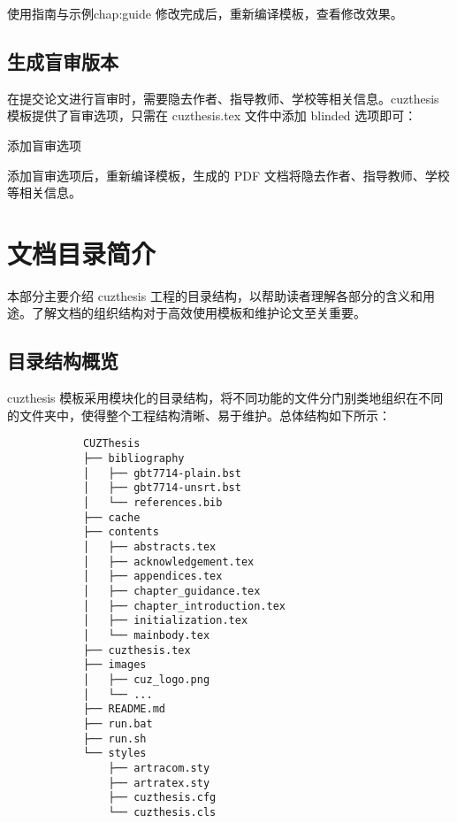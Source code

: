 \begin{cuzchapter}{使用指南与示例}{chap:guide}
    修改完成后，重新编译模板，查看修改效果。

    \subsection{生成盲审版本}

    在提交论文进行盲审时，需要隐去作者、指导教师、学校等相关信息。cuzthesis 模板提供了盲审选项，只需在 cuzthesis.tex 文件中添加 blinded 选项即可：

    \begin{listing}[htbp]
        \caption{添加盲审选项}
        \label{code:blinded-option}
    \end{listing}

    添加盲审选项后，重新编译模板，生成的 PDF 文档将隐去作者、指导教师、学校等相关信息。

    \section{文档目录简介}\label{sec:directory}

    本部分主要介绍 cuzthesis 工程的目录结构，以帮助读者理解各部分的含义和用途。了解文档的组织结构对于高效使用模板和维护论文至关重要。

    \subsection{目录结构概览}\label{sub:directory-overview}

    cuzthesis 模板采用模块化的目录结构，将不同功能的文件分门别类地组织在不同的文件夹中，使得整个工程结构清晰、易于维护。总体结构如下所示：

    \begingroup
    \small\linespread{1}
    \begin{center}
        \begin{verbatim}
            CUZThesis
            ├── bibliography
            │   ├── gbt7714-plain.bst
            │   ├── gbt7714-unsrt.bst
            │   └── references.bib
            ├── cache
            ├── contents
            │   ├── abstracts.tex
            │   ├── acknowledgement.tex
            │   ├── appendices.tex
            │   ├── chapter_guidance.tex
            │   ├── chapter_introduction.tex
            │   ├── initialization.tex
            │   └── mainbody.tex
            ├── cuzthesis.tex
            ├── images
            │   ├── cuz_logo.png
            │   └── ...
            ├── README.md
            ├── run.bat
            ├── run.sh
            └── styles
                ├── artracom.sty
                ├── artratex.sty
                ├── cuzthesis.cfg
                └── cuzthesis.cls
        \end{verbatim}
    \end{center}
    \endgroup


\end{cuzchapter}
